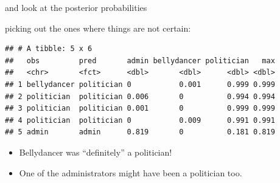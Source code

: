 \documentclass[
  ignorenonframetext,
]{beamer}
\newenvironment{Shaded}{\begin{snugshade}}{\end{snugshade}}
\newcommand{\DataTypeTok}[1]{\textcolor[rgb]{0.13,0.29,0.53}{#1}}
\newcommand{\DecValTok}[1]{\textcolor[rgb]{0.00,0.00,0.81}{#1}}
\newcommand{\FloatTok}[1]{\textcolor[rgb]{0.00,0.00,0.81}{#1}}
\newcommand{\KeywordTok}[1]{\textcolor[rgb]{0.13,0.29,0.53}{\textbf{#1}}}
\newcommand{\NormalTok}[1]{#1}
\newcommand{\OperatorTok}[1]{\textcolor[rgb]{0.81,0.36,0.00}{\textbf{#1}}}
\newcommand{\StringTok}[1]{\textcolor[rgb]{0.31,0.60,0.02}{#1}}
\begin{document}
\begin{frame}[fragile]{and look at the posterior probabilities}
\protect\hypertarget{and-look-at-the-posterior-probabilities}{}

picking out the ones where things are not certain:

\footnotesize

\begin{Shaded}
\end{Shaded}

\begin{verbatim}
## # A tibble: 5 x 6
##   obs         pred       admin bellydancer politician   max
##   <chr>       <fct>      <dbl>       <dbl>      <dbl> <dbl>
## 1 bellydancer politician 0           0.001      0.999 0.999
## 2 politician  politician 0.006       0          0.994 0.994
## 3 politician  politician 0.001       0          0.999 0.999
## 4 politician  politician 0           0.009      0.991 0.991
## 5 admin       admin      0.819       0          0.181 0.819
\end{verbatim}

\normalsize

\begin{itemize}
\item
  Bellydancer was ``definitely'' a politician!
\item
  One of the administrators might have been a politician too.
\end{itemize}

\end{frame}
\end{document}
